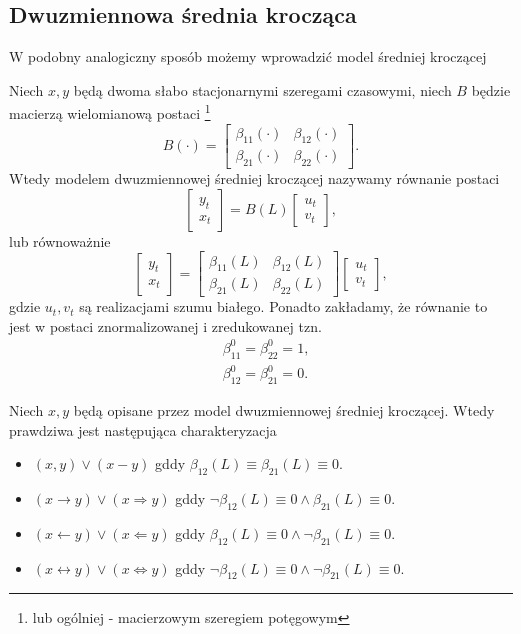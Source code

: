 \documentclass[10pt,a4paper]{book}
\begin{document}
\subsection{Dwuzmiennowa średnia krocząca}

W podobny analogiczny sposób możemy wprowadzić model średniej kroczącej

\begin{definition}
Niech $x,y$ będą dwoma słabo stacjonarnymi szeregami czasowymi, niech $B$ będzie macierzą wielomianową postaci \footnote{lub ogólniej - macierzowym szeregiem potęgowym}
$$
B(\cdot) = \begin{bmatrix}
\beta_{11} (\cdot) & \beta_{12} (\cdot)\\
\beta_{21} (\cdot) & \beta_{22} (\cdot)
\end{bmatrix}.
$$
Wtedy modelem dwuzmiennowej średniej kroczącej nazywamy równanie postaci
$$
\begin{bmatrix}
y_t\\ x_t
\end{bmatrix} = B(L) \begin{bmatrix}
u_t \\ v_t
\end{bmatrix},
$$
lub równoważnie
$$
 \begin{bmatrix}
y_t\\ x_t
\end{bmatrix} = \begin{bmatrix}
\beta_{11} (L) & \beta_{12} (L)\\
\beta_{21} (L) & \beta_{22} (L)
\end{bmatrix} \begin{bmatrix}
u_t \\ v_t
\end{bmatrix},
$$
gdzie $u_t, v_t$ są realizacjami szumu białego. Ponadto zakładamy, że równanie to jest w postaci znormalizowanej i zredukowanej tzn.
\begin{align*}
& \beta_{11}^0 = \beta_{22}^0 = 1,\\
& \beta_{12}^0 = \beta_{21}^0 = 0.
\end{align*}
\end{definition}

\begin{theorem}
Niech $x,y$ będą opisane przez model dwuzmiennowej średniej kroczącej. Wtedy prawdziwa jest następująca charakteryzacja
\begin{itemize}
\item $ (x,y) \lor (x-y)$ gddy $\beta_{12}(L) \equiv \beta_{21}(L) \equiv 0$.
\item $ (x \rightarrow y) \lor (x \Rightarrow y)$ gddy $ \lnot \beta_{12}(L) \equiv 0 \land \beta_{21}(L) \equiv 0$. 
\item $ (x \leftarrow y) \lor (x \Leftarrow y)$ gddy $  \beta_{12}(L) \equiv 0 \land \lnot \beta_{21}(L) \equiv 0$.
\item $ (x \leftrightarrow y) \lor (x \Leftrightarrow y)$ gddy $ \lnot \beta_{12}(L) \equiv 0 \land \lnot \beta_{21}(L) \equiv 0$.
\end{itemize}
\end{theorem}
\end{document}
